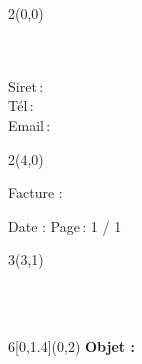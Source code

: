 \begin{textblock}{2}(0,0)
\begin{huge}\aenom\end{huge}
\vskip 0cm
{\fontsize{0.44cm}{0.5cm}
\aeadresse{}\\
\aeville{}\\
\aepays{} }
\vskip 0.2cm
{\fontsize{0.44cm}{0.5cm}
Siret\,:\hspace*{0.5cm}\aesiret{}\\
Tél\,:\hspace*{0.7cm}\aetel{}\\
Email\,:\hspace*{0.3cm}\aeemail{} }
\end{textblock}

\begin{textblock}{2}(4,0)
\begin{huge} Facture : \hfill \facturenum{}\end{huge}
\vskip 0.1cm
{\fontsize{0.44cm}{0.5cm}%
Date : \facturedate{}{}
\hfill Page\,: 1 / 1}
\end{textblock}

\begin{textblock}{3}(3,1)
\begin{huge} \clientnom{}\end{huge}
\vskip 0cm
{\fontsize{0.44cm}{0.5cm}
\clientadresse{} \\
\clientville{} \\
\clientpays{}
}
\vskip 0cm
\end{textblock}

\begin{textblock}{6}[0,1.4](0,2)
{\fontsize{0.44cm}{0.5cm}
\textbf{Objet : \factureobjet{}} }
\end{textblock}

